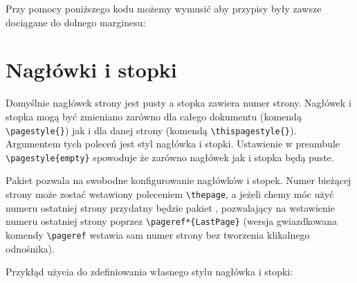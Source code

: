 \documentclass[fontSize=10pt,extra]{pdfArticle}
\let\svfootnoterule\footnoterule
\renewcommand\footnoterule{\vfill\svfootnoterule}
\begin{document}
Przy pomocy poniższego kodu możemy wymusić aby przypisy były zawsze dociągane do dolnego marginesu:
\begin{MintedCode}
\let\svfootnoterule\footnoterule
\renewcommand\footnoterule{\vfill\svfootnoterule}
\end{MintedCode}

\section{Nagłówki i stopki}

Domyślnie nagłówek strony jest pusty a stopka zawiera numer strony.
Nagłówek i stopka mogą być zmieniano zarówno dla całego dokumentu (komendą \Verb$\pagestyle{}$) jak i dla danej strony (komendą \Verb$\thispagestyle{}$).
Argumentem tych poleceń jest styl nagłówka i stopki. Ustawienie w preambule \Verb$\pagestyle{empty}$ spowoduje że zarówno nagłówek jak i stopka będą puste.

Pakiet  pozwala na swobodne konfigurowanie nagłówków i stopek. Numer bieżącej strony może zostać wstawiony poleceniem \Verb$\thepage$, a jeżeli chemy móc użyć numeru ostatniej strony przydatny będzie pakiet , pozwalający na wstawienie numeru ostatniej strony poprzez \Verb$\pageref*{LastPage}$ (wersja gwiazdkowana komendy \Verb$\pageref$ wstawia sam numer strony bez tworzenia klikalnego odnośnika).

\begin{CatchExample*}{1}
\renewcommand*{\DTMdisplaydate}[4]{\number#1-\DTMtwodigits{#2}-\DTMtwodigits{#3}}
\renewcommand*{\DTMDisplaydate}{\DTMdisplaydate}
\renewcommand*{\DTMdisplaytime}[3]{\DTMtwodigits{#1}:\DTMtwodigits{#2}:\DTMtwodigits{#3}}
\renewcommand*{\DTMdisplayzone}[2]{\ifnum#1<0-\else+\fi\DTMtwodigits{#1}\DTMtwodigits{#2}}
\renewcommand*{\DTMdisplay}[9]{
	\DTMdisplaydate{#1}{#2}{#3}{#4} 
	\DTMdisplaytime{#5}{#6}{#7} 
	\DTMdisplayzone{#8}{#9}
}
\renewcommand*{\DTMDisplay}{\DTMdisplay}
\end{CatchExample*}

\putExampleTeX[1]

Przykłąd użycia  do zdefiniowania własnego stylu nagłówka i stopki:
\begin{CatchExample}
\thispagestyle{stylSpecjalny}
\end{CatchExample}
\end{document}
